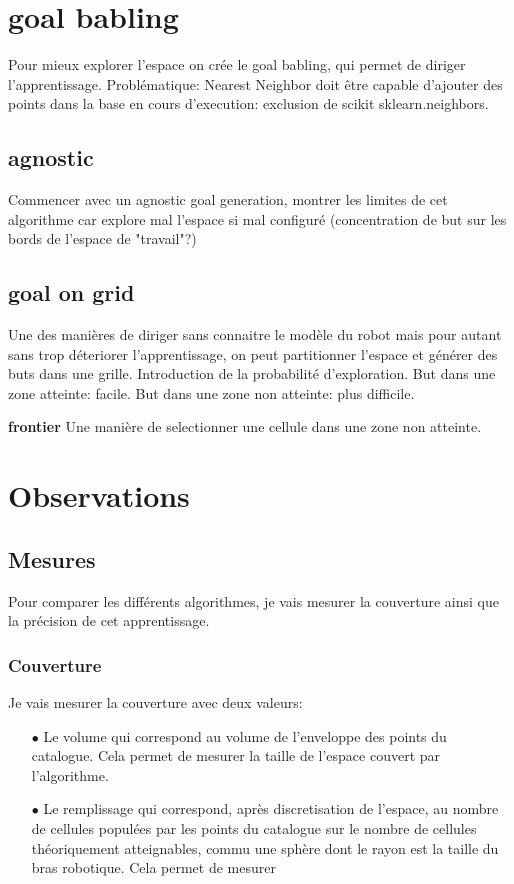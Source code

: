 \documentclass[11pt,french]{report}
\begin{document}
\section{goal babling}
Pour mieux explorer l'espace on crée le goal babling, qui permet de diriger l'apprentissage. Problématique: Nearest Neighbor doit être capable d'ajouter des points dans la base en cours d'execution: exclusion de scikit sklearn.neighbors. 

\subsection{agnostic}
Commencer avec un agnostic goal generation, montrer les limites de cet algorithme car explore mal l'espace si mal configuré (concentration de but sur les bords de l'espace de "travail"?)

\subsection{goal on grid}
Une des manières de diriger sans connaitre le modèle du robot mais pour autant sans trop déteriorer l'apprentissage, on peut partitionner l'espace et générer des buts dans une grille. Introduction de la probabilité d'exploration. But dans une zone atteinte: facile. But dans une zone non atteinte: plus difficile.

\textbf{frontier}
Une manière de selectionner une cellule dans une zone non atteinte.

\section{Observations}

\subsection{Mesures}
Pour comparer les différents algorithmes, je vais mesurer la couverture ainsi que la précision de cet apprentissage.

\subsubsection{Couverture}
Je vais mesurer la couverture avec deux valeurs:
\begin{itemize}
    \item[$\bullet$] Le volume qui correspond au volume de l'enveloppe des points du catalogue. Cela permet de mesurer la taille de l'espace couvert par l'algorithme.
    \item[$\bullet$] Le remplissage qui correspond, après discretisation de l'espace, au nombre de cellules populées par les points du catalogue sur le nombre de cellules théoriquement atteignables, commu une sphère dont le rayon est la taille du bras robotique. Cela permet de mesurer
\end{itemize}
\end{document}
